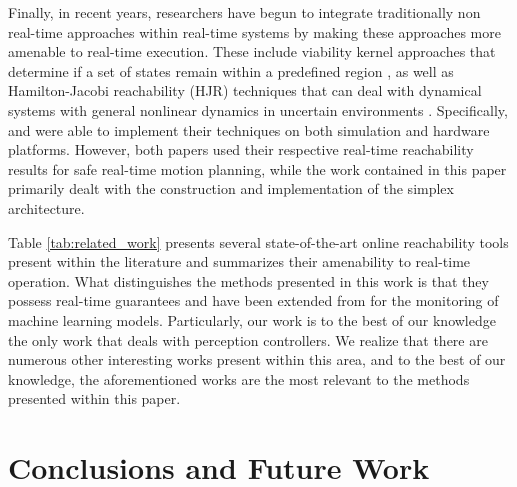 \documentclass[manuscript,screen,review]{acmart}
\begin{document}
Finally, in recent years, researchers have begun to integrate traditionally non real-time approaches within real-time systems by making these approaches more amenable to real-time execution. These include viability kernel approaches that determine if a set of states remain within a predefined region \cite{Gurriet2018,Althoff2014}, as well as Hamilton-Jacobi reachability (HJR) techniques that can deal with dynamical systems with general nonlinear dynamics in uncertain environments \cite{Herbert2019,Bajcsy2019Provably,bansal2020hamiltonjacobi,Fisac2017,Chen2016,dhinakaran2017hybrid}. Specifically, \cite{Bajcsy2019Provably} and \cite{Althoff2014} were able to implement their techniques on both simulation and hardware platforms. However, both papers used their respective real-time reachability results for safe real-time motion planning, while the work contained in this paper primarily dealt with the construction and implementation of the simplex architecture. 



Table \ref{tab:related_work} presents several state-of-the-art online reachability tools present within the literature and summarizes their amenability to real-time operation. What distinguishes the methods presented in this work is that they possess real-time guarantees and have been extended from \cite{Johnson2016} for the monitoring of machine learning models. Particularly, our work is to the best of our knowledge the only work that deals with perception controllers. We realize that there are numerous other interesting works present within this area, and to the best of our knowledge, the aforementioned works are the most relevant to the methods presented within this paper.   

\section{Conclusions and Future Work}
\end{document}
